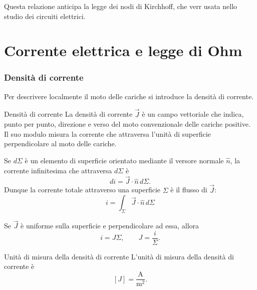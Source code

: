 \documentclass[a4paper]{article}
\begin{document}
Questa relazione anticipa la legge dei nodi di Kirchhoff, che verr usata nello studio dei circuiti elettrici.

\pagebreak
\part{Corrente elettrica e legge di Ohm}

\section{Densità di corrente}

Per descrivere localmente il moto delle cariche si introduce la densità di corrente.

\begin{snippetdefinition}{Densità di corrente}
    La densità di corrente \(\vec{J}\) è un campo vettoriale che indica, punto per punto, direzione e verso del moto convenzionale delle cariche positive. Il suo modulo misura la corrente che attraversa l'unità di superficie perpendicolare al moto delle cariche.
\end{snippetdefinition}

Se \(d\Sigma\) è un elemento di superficie orientato mediante il versore normale \(\hat{n}\), la corrente infinitesima che attraversa \(d\Sigma\) è
\[
    di=\vec{J}\cdot\hat{n}\,d\Sigma.
\]
Dunque la corrente totale attraverso una superficie \(\Sigma\) è il flusso di \(\vec{J}\):
\[
    i=\int_\Sigma \vec{J}\cdot\hat{n}\,d\Sigma
\]

Se \(\vec{J}\) è uniforme sulla superficie e perpendicolare ad essa, allora
\[
    i=J\Sigma,
    \qquad
    J=\frac{i}{\Sigma}.
\]

\begin{snippetdefinition}{Unità di misura della densità di corrente}
    L'unità di misura della densità di corrente è
    \[
        [J]=\frac{\mathrm{A}}{\mathrm{m}^2}.
    \]
\end{snippetdefinition}

\begin{center}
\end{center}
\end{document}
